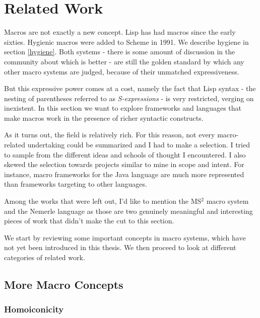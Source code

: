 \chapter{Related Work}
\label{state_art}

Macros are not exactly a new concept. Lisp has had macros since the early
sixties. Hygienic macros were added to Scheme in 1991. We describe hygiene in
section \ref{hygiene}. Both systems - there is some amount of discussion in the
community about which is better - are still the golden standard by which any
other macro systems are judged, because of their unmatched expressiveness.

But this expressive power comes at a cost, namely the fact that Lisp syntax -
the nesting of parentheses referred to as \emph{S-expressions} - is very
restricted, verging on inexistent. In this section we want to explore frameworks
and languages that make macros work in the presence of richer syntactic
constructs.

As it turns out, the field is relatively rich. For this reason, not every
macro-related undertaking could be summarized and I had to make a selection. I
tried to sample from the different ideas and schools of thought I encountered. I
also skewed the selection towards projects similar to mine in scope and
intent. For instance, macro frameworks for the Java language are much more
represented than frameworks targeting to other languages.

Among the works that were left out, I'd like to mention the MS$^2$ macro system
\cite{weise93} and the Nemerle language \cite{nemerle_paper} \cite{nemerle_web}
as those are two genuinely meaningful and interesting pieces of work that didn't
make the cut to this section.

We start by reviewing some important concepts in macro systems, which have not
yet been introduced in this thesis. We then proceed to look at different
categories of related work.

\section{More Macro Concepts}

\subsection{Homoiconicity}

